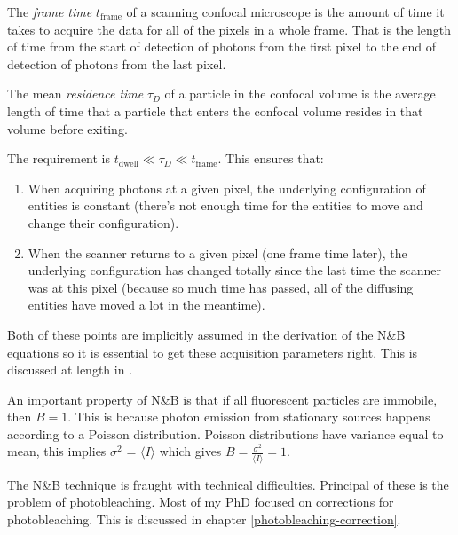 \documentclass[12pt,]{book}
\providecommand{\tightlist}{%
  \setlength{\itemsep}{0pt}\setlength{\parskip}{0pt}}
\theoremstyle{definition}
\theoremstyle{definition}
\theoremstyle{definition}
\theoremstyle{remark}
\let\BeginKnitrBlock\begin \let\EndKnitrBlock\end
\begin{document}
\BeginKnitrBlock{definition}
\protect\hypertarget{def:unnamed-chunk-16}{}{\label{def:unnamed-chunk-16}
}The \emph{frame time} \(t_\text{frame}\) of a scanning confocal
microscope is the amount of time it takes to acquire the data for all of
the pixels in a whole frame. That is the length of time from the start
of detection of photons from the first pixel to the end of detection of
photons from the last pixel.
\EndKnitrBlock{definition}

\BeginKnitrBlock{definition}
\protect\hypertarget{def:unnamed-chunk-17}{}{\label{def:unnamed-chunk-17}
}The mean \emph{residence time} \(\tau_D\) of a particle in the confocal
volume is the average length of time that a particle that enters the
confocal volume resides in that volume before exiting.
\EndKnitrBlock{definition}

The requirement is \(t_\text{dwell} \ll \tau_D \ll t_\text{frame}\).
This ensures that:

\begin{enumerate}
\def\labelenumi{\arabic{enumi}.}
\tightlist
\item
  When acquiring photons at a given pixel, the underlying configuration
  of entities is constant (there's not enough time for the entities to
  move and change their configuration).
\item
  When the scanner returns to a given pixel (one frame time later), the
  underlying configuration has changed totally since the last time the
  scanner was at this pixel (because so much time has passed, all of the
  diffusing entities have moved a lot in the meantime).
\end{enumerate}

Both of these points are implicitly assumed in the derivation of the
N\&B equations so it is essential to get these acquisition parameters
right. This is discussed at length in \citet{NBreview}.

An important property of N\&B is that if all fluorescent particles are
immobile, then \(B = 1\). This is because photon emission from
stationary sources happens according to a Poisson distribution. Poisson
distributions have variance equal to mean, this implies \(\sigma^2\) =
\(\langle I \rangle\) which gives
\(B = \frac{\sigma^2}{\langle I \rangle} = 1\).

The N\&B technique is fraught with technical difficulties. Principal of
these is the problem of photobleaching. Most of my PhD focused on
corrections for photobleaching. This is discussed in chapter
\ref{photobleaching-correction}.
\end{document}
